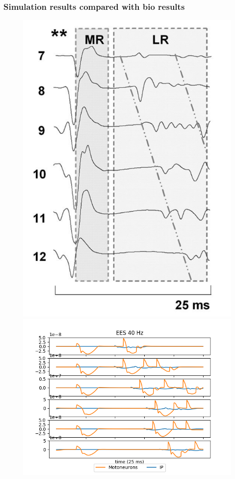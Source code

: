 \documentclass[12pt, aspectratio=169]{beamer}
\begin{document}
\begin{frame}
  \frametitle{Simulation results compared with bio results}
  \begin{figure}
    \includegraphics[width=0.2725\linewidth]{mscs_biological_results}
    \includegraphics[width=0.60\linewidth]{cpg_40Hz_100p}
  \end{figure}
\end{frame}
\end{document}
